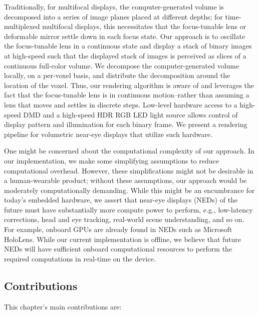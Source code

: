 Traditionally, for multifocal displays, the computer-generated volume is decomposed into a series of image planes placed at different depths; for time-multiplexed multifocal displays, this necessitates that the focus-tunable lens or deformable mirror settle down in each focus state. Our approach is to oscillate the focus-tunable lens in a continuous state and display a stack of binary images at high-speed such that the displayed stack of images is perceived as slices of a continuous full-color volume. We decompose the computer-generated volume locally, on a per-voxel basis, and distribute the decomposition around the location of the voxel. Thus, our rendering algorithm is aware of and leverages the fact that the focus-tunable lens is in continuous motion--rather than assuming a lens that moves and settles in discrete steps. Low-level hardware access to a high-speed DMD and a high-speed HDR RGB LED light source allows control of display pattern and illumination for each binary frame. We present a rendering pipeline for volumetric near-eye displays that utilize such hardware.

One might be concerned about the computational complexity of our approach. In our implementation, we make some simplifying assumptions to reduce computational overhead. However, these simplifications might not be desirable in a human-wearable product; without these assumptions, our approach would be moderately computationally demanding. While this might be an encumbrance for today's embedded hardware, we assert that near-eye displays (NEDs) of the future must have substantially more compute power to perform, e.g., low-latency corrections, head and eye tracking, real-world scene understanding, and so on. For example, onboard GPUs are already found in NEDs such as Microsoft HoloLens. While our current implementation is offline, we believe that future NEDs will have sufficient onboard computational resources to perform the required computations in real-time on the device.  
% 
% 
% 

\subsection{Contributions}
\label{sec:Contributions}
This chapter's main contributions are: 

